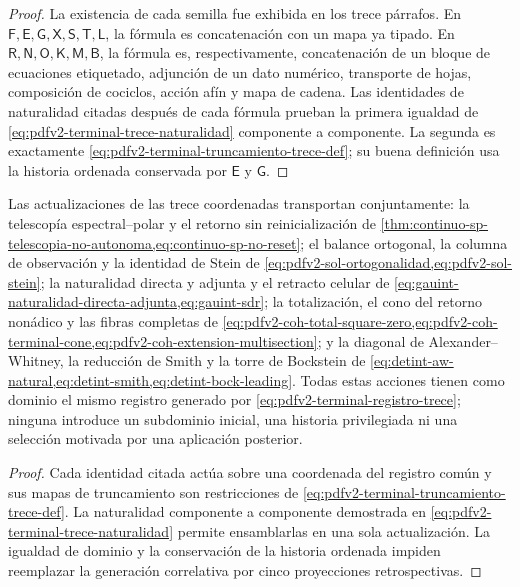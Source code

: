 \begin{proof}
La existencia de cada semilla fue exhibida en los trece párrafos. En
\(\mathsf F,\mathsf E,\mathsf G,\mathsf X,\mathsf S,\mathsf T,\mathsf L\),
la fórmula es concatenación con un mapa ya tipado. En
\(\mathsf R,\mathsf N,\mathsf O,\mathsf K,\mathsf M,\mathsf B\), la
fórmula es, respectivamente, concatenación de un bloque de ecuaciones
etiquetado, adjunción de un dato numérico, transporte de hojas, composición
de cociclos, acción afín y mapa de cadena. Las identidades de naturalidad
citadas después de cada fórmula prueban la primera igualdad de
\eqref{eq:pdfv2-terminal-trece-naturalidad} componente a componente. La
segunda es exactamente
\eqref{eq:pdfv2-terminal-truncamiento-trece-def}; su buena definición usa la
historia ordenada conservada por \(\mathsf E\) y \(\mathsf G\).
\end{proof}

\begin{proposition}
\label{prop:pdfv2-terminal-cinco-desarrollos-integrales}
Las actualizaciones de las trece coordenadas transportan conjuntamente:
la telescopía espectral--polar y el retorno sin reinicialización de
\cref{thm:continuo-sp-telescopia-no-autonoma,eq:continuo-sp-no-reset};
el balance ortogonal, la columna de observación y la identidad de Stein de
\cref{eq:pdfv2-sol-ortogonalidad,eq:pdfv2-sol-stein}; la naturalidad directa
y adjunta y el retracto celular de
\cref{eq:gauint-naturalidad-directa-adjunta,eq:gauint-sdr}; la totalización,
el cono del retorno nonádico y las fibras completas de
\cref{eq:pdfv2-coh-total-square-zero,eq:pdfv2-coh-terminal-cone,eq:pdfv2-coh-extension-multisection}; y la diagonal de
Alexander--Whitney, la reducción de Smith y la torre de Bockstein de
\cref{eq:detint-aw-natural,eq:detint-smith,eq:detint-bock-leading}.
Todas estas acciones tienen como dominio el mismo registro generado por
\eqref{eq:pdfv2-terminal-registro-trece}; ninguna introduce un subdominio
inicial, una historia privilegiada ni una selección motivada por una
aplicación posterior.
\end{proposition}

\begin{proof}
Cada identidad citada actúa sobre una coordenada del registro común y sus
mapas de truncamiento son restricciones de
\eqref{eq:pdfv2-terminal-truncamiento-trece-def}. La naturalidad componente
a componente demostrada en
\eqref{eq:pdfv2-terminal-trece-naturalidad} permite ensamblarlas en una sola
actualización. La igualdad de dominio y la conservación de la historia
ordenada impiden reemplazar la generación correlativa por cinco
proyecciones retrospectivas.
\end{proof}

